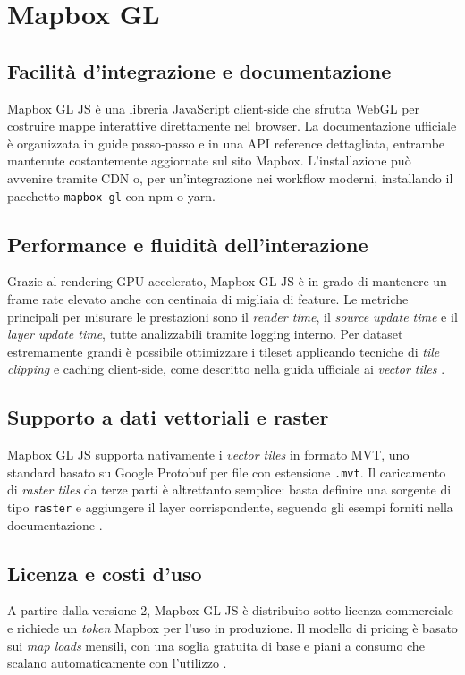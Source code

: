 \section{Mapbox GL}
\label{ch:mapbox}

\subsection{Facilità d'integrazione e documentazione}  
Mapbox GL JS è una libreria JavaScript client-side che sfrutta WebGL per costruire mappe interattive direttamente nel browser.  
La documentazione ufficiale è organizzata in guide passo‑passo e in una API reference dettagliata, entrambe mantenute costantemente aggiornate sul sito Mapbox.  
L'installazione può avvenire tramite CDN o, per un'integrazione nei workflow moderni, installando il pacchetto \texttt{mapbox-gl} con npm o yarn. \cite{mapbox-docs}  

\subsection{Performance e fluidità dell'interazione}  
Grazie al rendering GPU‑accelerato, Mapbox GL JS è in grado di mantenere un frame rate elevato anche con centinaia di migliaia di feature.
Le metriche principali per misurare le prestazioni sono il \emph{render time}, il \emph{source update time} e il \emph{layer update time}, tutte analizzabili tramite logging interno.  
Per dataset estremamente grandi è possibile ottimizzare i tileset applicando tecniche di \emph{tile clipping} e caching client-side, come descritto nella guida ufficiale ai \textit{vector tiles} \cite{mapbox-vector, article-highperf}.  

\subsection{Supporto a dati vettoriali e raster}  
Mapbox GL JS supporta nativamente i \emph{vector tiles} in formato MVT, uno standard basato su Google Protobuf per file con estensione \texttt{.mvt}\cite{mapbox-vector}.  
Il caricamento di \emph{raster tiles} da terze parti è altrettanto semplice: basta definire una sorgente di tipo \texttt{raster} e aggiungere il layer corrispondente, seguendo gli esempi forniti nella documentazione \cite{mapbox-raster}.  

\subsection{Licenza e costi d'uso}  
A partire dalla versione 2, Mapbox GL JS è distribuito sotto licenza commerciale e richiede un \textit{token} Mapbox per l'uso in produzione.  
Il modello di pricing è basato sui \emph{map loads} mensili, con una soglia gratuita di base e piani a consumo che scalano automaticamente con l'utilizzo \cite{mapbox-license-v2, mapbox-pricing}.  

